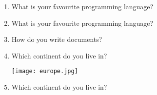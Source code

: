 \documentclass[12pt,onside,a4paper,article]{memoir}
\begin{document}
\begin{enumerate}
\setcounter{page}{1}

\item{What is your favourite programming language?}
\begin{flushright}
\vspace{3cm}

\end{flushright}
\item{What is your favourite programming language?}
\begin{flushright}
\vspace{3cm}

\end{flushright}
\item{How do you write documents?}
\begin{flushright}
\vspace{3cm}

\end{flushright}
\item{Which continent do you live in?}
\begin{flushright}
\vspace{3cm}

\end{flushright}
\begin{flushleft}
\texttt{[image: europe.jpg]}
\end{flushleft}
\item{Which continent do you live in?}
\begin{flushright}
\vspace{3cm}


\end{flushright}
\end{enumerate}
\end{document}
